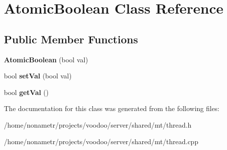 \hypertarget{classAtomicBoolean}{\section{\-Atomic\-Boolean \-Class \-Reference}
\label{classAtomicBoolean}
}
\subsection*{\-Public \-Member \-Functions}
\begin{DoxyCompactItemize}
\item 
\hypertarget{classAtomicBoolean_a562a704c03897cbaf8f95b73d1e63df0}{{\bfseries \-Atomic\-Boolean} (bool val)}\label{classAtomicBoolean_a562a704c03897cbaf8f95b73d1e63df0}

\item 
\hypertarget{classAtomicBoolean_a7f1816ac1fb9d992f830bcf64a56a5ab}{bool {\bfseries set\-Val} (bool val)}\label{classAtomicBoolean_a7f1816ac1fb9d992f830bcf64a56a5ab}

\item 
\hypertarget{classAtomicBoolean_a564480e3423763ec212471429d9bd659}{bool {\bfseries get\-Val} ()}\label{classAtomicBoolean_a564480e3423763ec212471429d9bd659}

\end{DoxyCompactItemize}


\-The documentation for this class was generated from the following files\-:\begin{DoxyCompactItemize}
\item 
/home/nonametr/projects/voodoo/server/shared/mt/thread.\-h\item 
/home/nonametr/projects/voodoo/server/shared/mt/thread.\-cpp\end{DoxyCompactItemize}
